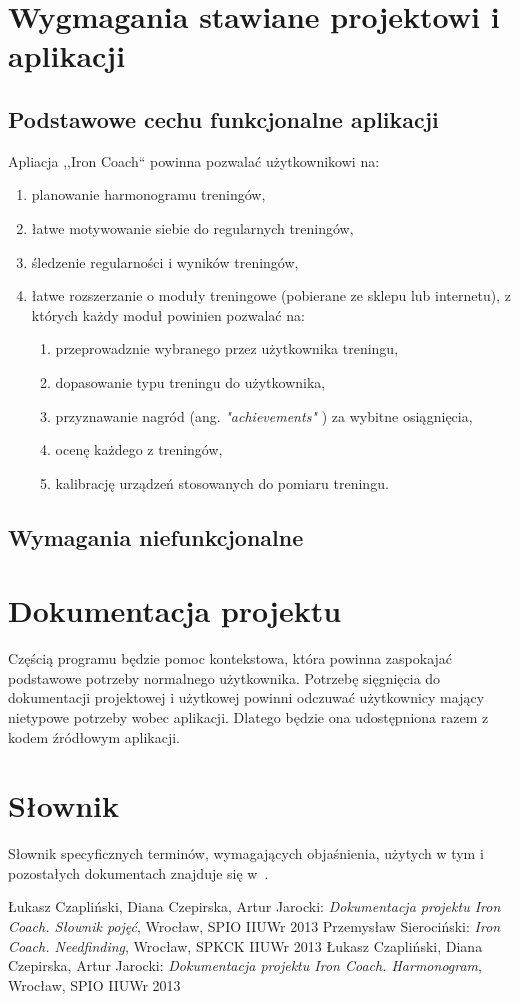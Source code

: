 \section{Wygmagania stawiane projektowi i aplikacji}
\subsection{Podstawowe cechu funkcjonalne aplikacji}
\label{pfunk}
\noindent Apliacja ,,Iron Coach`` powinna pozwalać użytkownikowi na:
\begin{enumerate}
  \item planowanie harmonogramu treningów,
  \item łatwe motywowanie siebie do regularnych treningów,
  \item śledzenie regularności i wyników treningów,
  \item łatwe rozszerzanie o moduły treningowe (pobierane ze sklepu lub internetu), z których każdy moduł powinien pozwalać na:
    \begin{enumerate}
      \item przeprowadznie wybranego przez użytkownika treningu,
      \item dopasowanie typu treningu do użytkownika,
      \item przyznawanie nagród (ang. {\it "achievements"} \cite{Sł}) za wybitne osiągnięcia,
      \item ocenę każdego z treningów,
      \item kalibrację urządzeń stosowanych do pomiaru treningu.
    \end{enumerate}
\end{enumerate}
\subsection{Wymagania niefunkcjonalne}
\section{Dokumentacja projektu}
\noindent Częścią programu będzie pomoc kontekstowa, która powinna zaspokajać podstawowe potrzeby normalnego użytkownika. Potrzebę sięgnięcia do dokumentacji projektowej i użytkowej powinni odczuwać użytkownicy mający nietypowe potrzeby wobec aplikacji. Dlatego będzie ona udostępniona razem z kodem źródłowym aplikacji.
\section{Słownik}
\noindent Słownik specyficznych terminów, wymagających objaśnienia, użytych w tym i pozostałych dokumentach znajduje się w~\cite{Sł}.
\begin{thebibliography}{99}
   Łukasz Czapliński, Diana Czepirska, Artur Jarocki: {\it Dokumentacja projektu Iron Coach. Słownik pojęć}, Wrocław, SPIO IIUWr 2013
   Przemysław Sierociński: {\it Iron Coach. Needfinding}, Wrocław, SPKCK IIUWr 2013
   Łukasz Czapliński, Diana Czepirska, Artur Jarocki: {\it Dokumentacja projektu Iron Coach. Harmonogram}, Wrocław, SPIO IIUWr 2013
\end{thebibliography}

